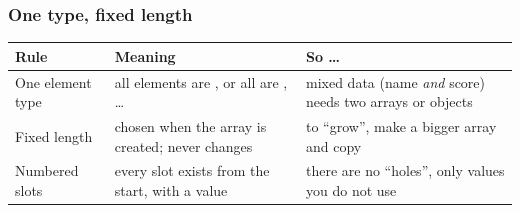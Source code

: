 \documentclass[aspectratio=169,10pt,compress]{beamer}
\begin{document}
\begin{frame}[t,fragile] \frametitle{One type, fixed length}


\begin{table}
		\small
		\begin{tabular}{@{}L{0.22\textwidth}L{0.34\textwidth}L{0.36\textwidth}@{}}
			\toprule
			\textbf{Rule} & \textbf{Meaning} & \textbf{So \dots} \\
			\midrule
			One element type & all elements are , or all are , \dots
			                 & mixed data (name \emph{and} score) needs two arrays or objects \\
			Fixed length     & chosen when the array is created; never changes
			                 & to ``grow'', make a bigger array and copy \\
			Numbered slots   & every slot exists from the start, with a value
			                 & there are no ``holes'', only values you do not use \\
			\bottomrule
		\end{tabular}
\end{table}%


	\begin{center}
	\end{center}
\end{frame}
\end{document}
